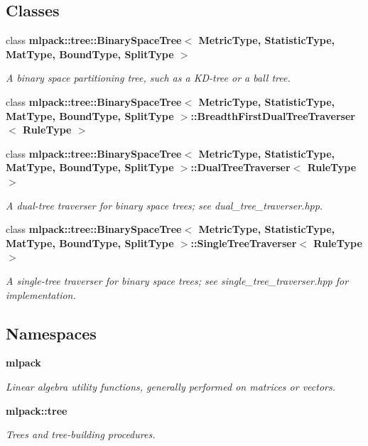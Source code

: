 \subsection*{Classes}
\begin{DoxyCompactItemize}
\item 
class {\bf mlpack\+::tree\+::\+Binary\+Space\+Tree$<$ Metric\+Type, Statistic\+Type, Mat\+Type, Bound\+Type, Split\+Type $>$}
\begin{DoxyCompactList}\small\item\em A binary space partitioning tree, such as a K\+D-\/tree or a ball tree. \end{DoxyCompactList}\item 
class {\bf mlpack\+::tree\+::\+Binary\+Space\+Tree$<$ Metric\+Type, Statistic\+Type, Mat\+Type, Bound\+Type, Split\+Type $>$\+::\+Breadth\+First\+Dual\+Tree\+Traverser$<$ Rule\+Type $>$}
\item 
class {\bf mlpack\+::tree\+::\+Binary\+Space\+Tree$<$ Metric\+Type, Statistic\+Type, Mat\+Type, Bound\+Type, Split\+Type $>$\+::\+Dual\+Tree\+Traverser$<$ Rule\+Type $>$}
\begin{DoxyCompactList}\small\item\em A dual-\/tree traverser for binary space trees; see dual\+\_\+tree\+\_\+traverser.\+hpp. \end{DoxyCompactList}\item 
class {\bf mlpack\+::tree\+::\+Binary\+Space\+Tree$<$ Metric\+Type, Statistic\+Type, Mat\+Type, Bound\+Type, Split\+Type $>$\+::\+Single\+Tree\+Traverser$<$ Rule\+Type $>$}
\begin{DoxyCompactList}\small\item\em A single-\/tree traverser for binary space trees; see single\+\_\+tree\+\_\+traverser.\+hpp for implementation. \end{DoxyCompactList}\end{DoxyCompactItemize}
\subsection*{Namespaces}
\begin{DoxyCompactItemize}
\item 
 {\bf mlpack}
\begin{DoxyCompactList}\small\item\em Linear algebra utility functions, generally performed on matrices or vectors. \end{DoxyCompactList}\item 
 {\bf mlpack\+::tree}
\begin{DoxyCompactList}\small\item\em Trees and tree-\/building procedures. \end{DoxyCompactList}\end{DoxyCompactItemize}
